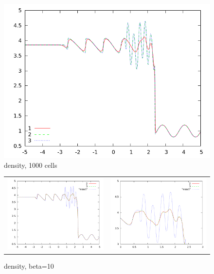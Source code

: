 \documentclass[10pt,preprint]{aastex}
\begin{document}
\begin{figure}[h]
  \begin{center}
     \includegraphics[width=.78\textwidth]{1000.png}	
  \end{center}
  \caption{density, 1000 cells}
\end{figure}

\begin{figure}
  \begin{center}
	\begin{tabular}{cc}
      \includegraphics[width=.425\textwidth]{10.png} &
	  \includegraphics[width=.425\textwidth]{10zoom.png}
	\end{tabular}
  \end{center}
  \caption{density, beta=10}
  \label{fig:pvcellcomp}
\end{figure}
\end{document}
